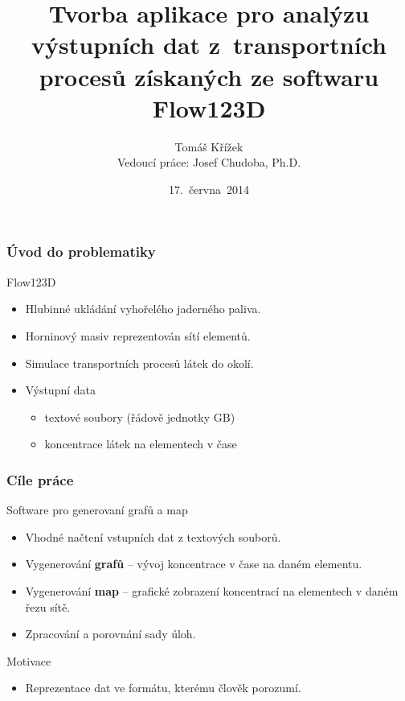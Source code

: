 \documentclass{beamer}
\begin{document}

\title[Tvorba aplikace pro analýzu výstupních dat z Flow123D]{Tvorba aplikace pro analýzu výstupních dat z~transportních procesů získaných ze softwaru Flow123D}
\author[Tomáš Křížek]{{\large Tomáš Křížek}\\{\scriptsize Vedoucí práce: Josef Chudoba, Ph.D.}}
\date{17.~června~2014}

\begin{frame}
	\titlepage
\end{frame}

\begin{frame}
	\frametitle{Úvod do problematiky}
	\begin{block}{Flow123D}
		\begin{itemize}
			\item Hlubinné ukládání vyhořelého jaderného paliva.
			\item Horninový masiv reprezentován sítí elementů.
			\item Simulace transportních procesů látek do okolí.
			\item Výstupní data
			\begin{itemize}
				\item textové soubory (řádově jednotky GB)
				\item koncentrace látek na elementech v čase
			\end{itemize}
		\end{itemize}
	\end{block}
\end{frame}

\begin{frame}
	\frametitle{Cíle práce}
	\begin{block}{Software pro generovaní grafů a map}
		\begin{itemize}
			\item Vhodné načtení vstupních dat z textových souborů.
			\item Vygenerování \textbf{grafů} -- vývoj koncentrace v čase na daném elementu.
			\item Vygenerování \textbf{map} -- grafické zobrazení koncentrací na elementech v daném řezu sítě.
			\item Zpracování a porovnání sady úloh.
		\end{itemize}
	\end{block}
	\begin{block}{Motivace}
		\begin{itemize}
			\item Reprezentace dat ve formátu, kterému člověk porozumí.
		\end{itemize}
	\end{block}
\end{frame}
\end{document}
